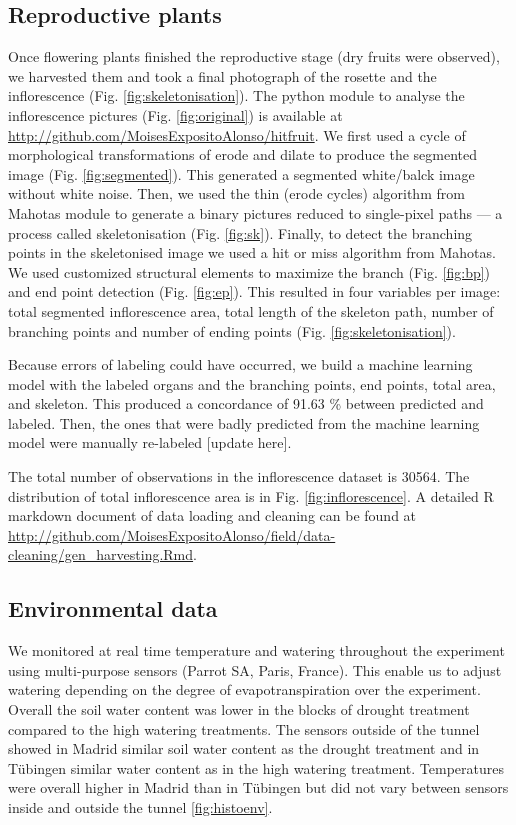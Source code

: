 \documentclass[12pt,]{article}
\begin{document}
\subsection{Reproductive plants}\label{reproductive-plants}

Once flowering plants finished the reproductive stage (dry fruits were
observed), we harvested them and took a final photograph of the rosette
and the inflorescence (Fig. \ref{fig:skeletonisation}). The python
module to analyse the inflorescence pictures (Fig. \ref{fig:original})
is available at \url{http://github.com/MoisesExpositoAlonso/hitfruit}.
We first used a cycle of morphological transformations of erode and
dilate to produce the segmented image (Fig. \ref{fig:segmented}). This
generated a segmented white/balck image without white noise. Then, we
used the thin (erode cycles) algorithm from Mahotas module to generate a
binary pictures reduced to single-pixel paths --- a process called
skeletonisation (Fig. \ref{fig:sk}). Finally, to detect the branching
points in the skeletonised image we used a hit or miss algorithm from
Mahotas. We used customized structural elements to maximize the branch
(Fig. \ref{fig:bp}) and end point detection (Fig. \ref{fig:ep}). This
resulted in four variables per image: total segmented inflorescence
area, total length of the skeleton path, number of branching points and
number of ending points (Fig. \ref{fig:skeletonisation}).

Because errors of labeling could have occurred, we build a machine
learning model with the labeled organs and the branching points, end
points, total area, and skeleton. This produced a concordance of 91.63
\% between predicted and labeled. Then, the ones that were badly
predicted from the machine learning model were manually re-labeled
{[}update here{]}.

The total number of observations in the inflorescence dataset is 30564.
The distribution of total inflorescence area is in Fig.
\ref{fig:inflorescence}. A detailed R markdown document of data loading
and cleaning can be found at
\url{http://github.com/MoisesExpositoAlonso/field/data-cleaning/gen_harvesting.Rmd}.

\subsection{Environmental data}\label{environmental-data}

We monitored at real time temperature and watering throughout the
experiment using multi-purpose sensors (Parrot SA, Paris, France). This
enable us to adjust watering depending on the degree of
evapotranspiration over the experiment. Overall the soil water content
was lower in the blocks of drought treatment compared to the high
watering treatments. The sensors outside of the tunnel showed in Madrid
similar soil water content as the drought treatment and in Tübingen
similar water content as in the high watering treatment. Temperatures
were overall higher in Madrid than in Tübingen but did not vary between
sensors inside and outside the tunnel \ref{fig:histoenv}.
\end{document}

